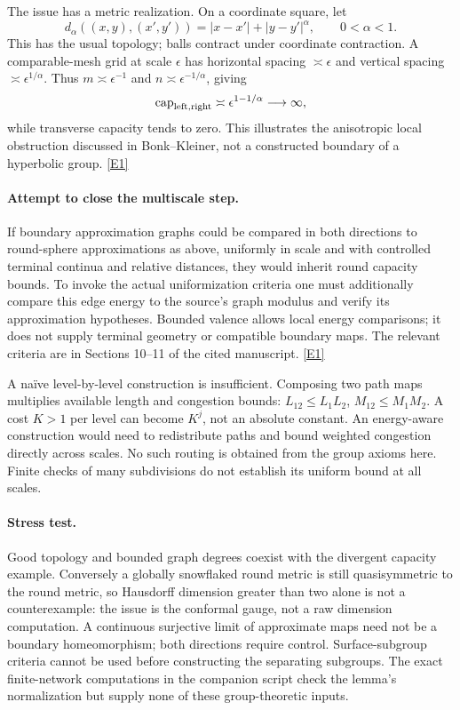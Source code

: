 \documentclass[11pt,a4paper]{article}
\newcommand{\eref}[2]{\hyperlink{extra:#1:#2}{[E#2]}}
\numberwithin{equation}{section}
\begin{document}
The issue has a metric realization. On a coordinate square, let
\[
 d_\alpha((x,y),(x',y'))=|x-x'|+|y-y'|^\alpha,
 \qquad 0<\alpha<1.
\]
This has the usual topology; balls contract under coordinate contraction.
A comparable-mesh grid at scale $\epsilon$ has horizontal spacing
$\asymp\epsilon$ and vertical spacing $\asymp\epsilon^{1/\alpha}$.
Thus $m\asymp\epsilon^{-1}$ and $n\asymp\epsilon^{-1/\alpha}$, giving
\[
 \operatorname{cap}_{\rm left,right}\asymp
 \epsilon^{1-1/\alpha}\longrightarrow\infty,
\]
while transverse capacity tends to zero. This illustrates the anisotropic
local obstruction discussed in Bonk--Kleiner, not a constructed boundary of
a hyperbolic group. \eref{30000030}{1}

\paragraph{Attempt to close the multiscale step.}
If boundary approximation graphs could be compared in both directions to
round-sphere approximations as above, uniformly in scale and with controlled
terminal continua and relative distances, they would inherit round capacity
bounds. To invoke the actual uniformization criteria one must additionally
compare this edge energy to the source's graph modulus and verify its
approximation hypotheses. Bounded valence allows local energy comparisons;
it does not supply terminal geometry or compatible boundary maps. The
relevant criteria are in Sections 10--11 of the cited manuscript.
\eref{30000030}{1}

A naïve level-by-level construction is insufficient. Composing two path
maps multiplies available length and congestion bounds:
$L_{12}\le L_1L_2$, $M_{12}\le M_1M_2$. A cost $K>1$ per level can become
$K^j$, not an absolute constant. An energy-aware construction would need
to redistribute paths and bound weighted congestion directly across scales.
No such routing is obtained from the group axioms here. Finite checks of
many subdivisions do not establish its uniform bound at all scales.

\paragraph{Stress test.}
Good topology and bounded graph degrees coexist with the divergent capacity
example. Conversely a globally snowflaked round metric is still
quasisymmetric to the round metric, so Hausdorff dimension greater than two
alone is not a counterexample: the issue is the conformal gauge, not a raw
dimension computation. A continuous surjective limit of approximate maps
need not be a boundary homeomorphism; both directions require control.
Surface-subgroup criteria cannot be used before constructing the separating
subgroups. The exact finite-network computations in the companion script
check the lemma's normalization but supply none of these group-theoretic
inputs.
\end{document}
